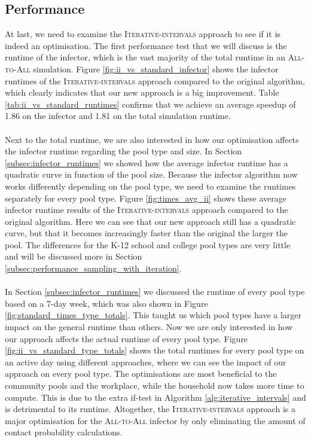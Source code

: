 \subsection{Performance}
\label{subsec:performance_iterative_intervals}
At last, we need to examine the \textsc{Iterative-intervals} approach to see if it is indeed an optimisation. The first performance test that we will discuss is the runtime of the infector, which is the vast majority of the total runtime in an \textsc{All-to-All} simulation. Figure \ref{fig:ii_vs_standard_infector} shows the infector runtimes of the \textsc{Iterative-intervals} approach compared to the original algorithm, which clearly indicates that our new approach is a big improvement. Table \ref{tab:ii_vs_standard_runtimes} confirms that we achieve an average speedup of 1.86 on the infector and 1.81 on the total simulation runtime.
\\\\
Next to the total runtime, we are also interested in how our optimisation affects the infector runtime regarding the pool type and size. In Section \ref{subsec:infector_runtimes} we showed how the average infector runtime has a quadratic curve in function of the pool size. Because the infector algorithm now works differently depending on the pool type, we need to examine the runtimes separately for every pool type. Figure \ref{fig:times_avg_ii} shows these average infector runtime results of the \textsc{Iterative-intervals} approach compared to the original algorithm. Here we can see that our new approach still has a quadratic curve, but that it becomes increasingly faster than the original the larger the pool. The differences for the K-12 school and college pool types are very little and will be discussed more in Section \ref{subsec:performance_sampling_with_iteration}.
\\\\
In Section \ref{subsec:infector_runtimes} we discussed the runtime of every pool type based on a 7-day week, which was also shown in Figure \ref{fig:standard_times_type_totals}. This taught us which pool types have a larger impact on the general runtime than others. Now we are only interested in how our approach affects the actual runtime of every pool type. Figure \ref{fig:ii_vs_standard_type_totals} shows the total runtimes for every pool type on an active day using different approaches, where we can see the impact of our approach on every pool type. The optimisations are most beneficial to the community pools and the workplace, while the household now takes more time to compute. This is due to the extra if-test in Algorithm \ref{alg:iterative_intervals} and is detrimental to its runtime. Altogether, the \textsc{Iterative-intervals} approach is a major optimisation for the \textsc{All-to-All} infector by only eliminating the amount of contact probability calculations.

